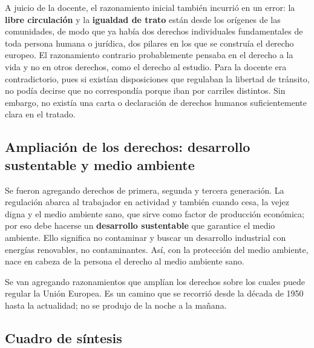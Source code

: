 \documentclass[12pt,oneside]{book}
\begin{document}
A juicio de la docente, el razonamiento inicial también incurrió en un error: la \textbf{libre circulación} y la \textbf{igualdad de trato} están desde los orígenes de las comunidades, de modo que ya había dos derechos individuales fundamentales de toda persona humana o jurídica, dos pilares en los que se construía el derecho europeo. El razonamiento contrario probablemente pensaba en el derecho a la vida y no en otros derechos, como el derecho al estudio. Para la docente era contradictorio, pues si existían disposiciones que regulaban la libertad de tránsito, no podía decirse que no correspondía porque iban por carriles distintos. Sin embargo, no existía una carta o declaración de derechos humanos suficientemente clara en el tratado.

\subsection{Ampliación de los derechos: desarrollo sustentable y medio ambiente}

Se fueron agregando derechos de primera, segunda y tercera generación. La regulación abarca al trabajador en actividad y también cuando cesa, la vejez digna y el medio ambiente sano, que sirve como factor de producción económica; por eso debe hacerse un \textbf{desarrollo sustentable} que garantice el medio ambiente. Ello significa no contaminar y buscar un desarrollo industrial con energías renovables, no contaminantes. Así, con la protección del medio ambiente, nace en cabeza de la persona el derecho al medio ambiente sano.

Se van agregando razonamientos que amplían los derechos sobre los cuales puede regular la Unión Europea. Es un camino que se recorrió desde la década de 1950 hasta la actualidad; no se produjo de la noche a la mañana.

\subsection{Cuadro de síntesis}
\end{document}
